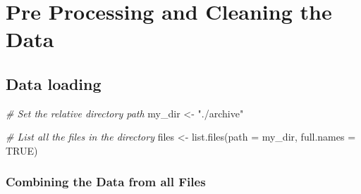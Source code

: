 \documentclass[
]{article}
\newenvironment{Shaded}{\begin{snugshade}}{\end{snugshade}}
\newcommand{\AttributeTok}[1]{\textcolor[rgb]{0.77,0.63,0.00}{#1}}
\newcommand{\CommentTok}[1]{\textcolor[rgb]{0.56,0.35,0.01}{\textit{#1}}}
\newcommand{\ConstantTok}[1]{\textcolor[rgb]{0.00,0.00,0.00}{#1}}
\newcommand{\FunctionTok}[1]{\textcolor[rgb]{0.00,0.00,0.00}{#1}}
\newcommand{\NormalTok}[1]{#1}
\newcommand{\OtherTok}[1]{\textcolor[rgb]{0.56,0.35,0.01}{#1}}
\newcommand{\StringTok}[1]{\textcolor[rgb]{0.31,0.60,0.02}{#1}}
\begin{document}
\hypertarget{pre-processing-and-cleaning-the-data}{%
\section{Pre Processing and Cleaning the
Data}\label{pre-processing-and-cleaning-the-data}}

\hypertarget{data-loading}{%
\subsection{Data loading}\label{data-loading}}

\begin{Shaded}
\begin{Highlighting}[]
\CommentTok{\# Set the relative directory path}
\NormalTok{my\_dir }\OtherTok{\textless{}{-}} \StringTok{"./archive"}

\CommentTok{\# List all the files in the directory}
\NormalTok{files }\OtherTok{\textless{}{-}} \FunctionTok{list.files}\NormalTok{(}\AttributeTok{path =}\NormalTok{ my\_dir, }\AttributeTok{full.names =} \ConstantTok{TRUE}\NormalTok{)}
\end{Highlighting}
\end{Shaded}

\hypertarget{combining-the-data-from-all-files}{%
\subsubsection{Combining the Data from all
Files}\label{combining-the-data-from-all-files}}
\end{document}
